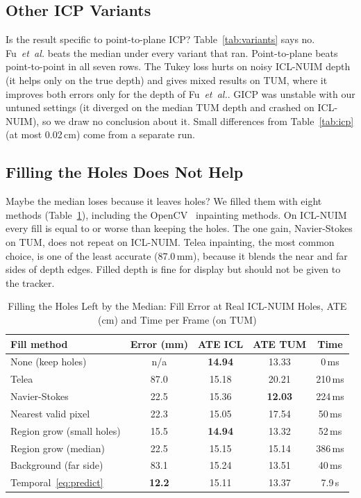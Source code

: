 \documentclass[conference]{IEEEtran}
\newcommand{\fu}{Fu~\emph{et~al.}}
\begin{document}
\subsection{Other ICP Variants}

Is the result specific to point-to-plane ICP? Table~\ref{tab:variants} says
no. \fu{} beats the median under every variant that ran. Point-to-plane beats
point-to-point in all seven rows. The Tukey loss hurts on noisy ICL-NUIM depth
(it helps only on the true depth) and gives mixed results on TUM, where it
improves both errors only for the depth of \fu{}. GICP was unstable with our
untuned settings (it diverged on the median TUM depth and crashed on
ICL-NUIM), so we draw no conclusion about it. Small differences from
Table~\ref{tab:icp} (at most 0.02\,cm) come from a separate run.

\subsection{Filling the Holes Does Not Help}

Maybe the median loses because it leaves holes? We filled them with eight
methods (Table~\ref{tab:fill}), including the OpenCV~\cite{bradski2000opencv}
inpainting methods. On ICL-NUIM every fill is equal to or worse than keeping
the holes. The one gain, Navier-Stokes on TUM, does not repeat on ICL-NUIM.
Telea inpainting, the most common choice, is one of the least accurate
(87.0\,mm), because it blends the near and far sides of depth edges. Filled
depth is fine for display but should not be given to the tracker.

\begin{table}[!t]
\caption{Filling the Holes Left by the Median: Fill Error at Real ICL-NUIM Holes, ATE (cm) and Time per Frame (on TUM)}
\label{tab:fill}
\centering
\small
\setlength{\tabcolsep}{1.4pt}
\begin{tabular}{@{}lcccc@{}}
\toprule
Fill method & Error (mm) & ATE ICL & ATE TUM & Time\\
\midrule
None (keep holes) & n/a & \textbf{14.94} & 13.33 & 0\,ms\\
Telea~\cite{telea2004image} & 87.0 & 15.18 & 20.21 & 210\,ms\\
Navier-Stokes~\cite{bertalmio2001navier} & 22.5 & 15.36 & \textbf{12.03} & 224\,ms\\
Nearest valid pixel & 22.3 & 15.05 & 17.54 & 50\,ms\\
Region grow (small holes) & 15.5 & \textbf{14.94} & 13.32 & 52\,ms\\
Region grow (median) & 22.5 & 15.15 & 15.14 & 386\,ms\\
Background (far side) & 83.1 & 15.24 & 13.51 & 40\,ms\\
Temporal~\eqref{eq:predict} & \textbf{12.2} & 15.11 & 13.37 & 7.9\,s\\
\bottomrule
\end{tabular}
\end{table}
\end{document}
